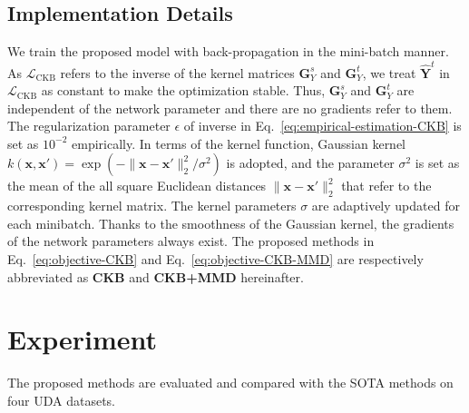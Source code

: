 \documentclass[final]{cvpr}
\newcommand{\MC}{\mathcal}
\newcommand{\MBF}{\mathbf}
\begin{document}
\subsection{Implementation Details}
\vspace{-2pt}
We train the proposed model with back-propagation in the mini-batch manner. As $\MC{L}_{\text{CKB}}$ refers to the inverse of the kernel matrices $\MBF{G}^{s}_Y$ and $\MBF{G}^{t}_Y$, we treat $\hat{\MBF{Y}}^t$ in $\MC{L}_{\text{CKB}}$ as constant to make the optimization stable. Thus, $\MBF{G}^{s}_Y$ and $\MBF{G}^{t}_Y$ are independent of the network parameter and there are no gradients refer to them. The regularization parameter $\epsilon$ of inverse in Eq.~\eqref{eq:empirical-estimation-CKB} is set as $10^{-2}$ empirically. In terms of the kernel function, Gaussian kernel $k(\MBF{x},\MBF{x}')=\exp\left( - \| \MBF{x} - \MBF{x}' \|^2_2 / \sigma^2 \right)$ is adopted, and the parameter ${\sigma^2}$ is set as the mean of the all square Euclidean distances $\| \MBF{x} - \MBF{x}' \|^2_2$ that refer to the corresponding kernel matrix. The
kernel parameters $\sigma$ are adaptively updated for each minibatch. Thanks to the smoothness of the Gaussian kernel, the gradients of the network parameters always exist. The proposed methods in Eq.~\eqref{eq:objective-CKB} and Eq.~\eqref{eq:objective-CKB-MMD} are respectively abbreviated as \textbf{CKB} and \textbf{CKB+MMD} hereinafter. %

\section{Experiment}
\vspace{-2pt}
The proposed methods are evaluated and compared with the SOTA methods on four UDA datasets.

\end{document}
